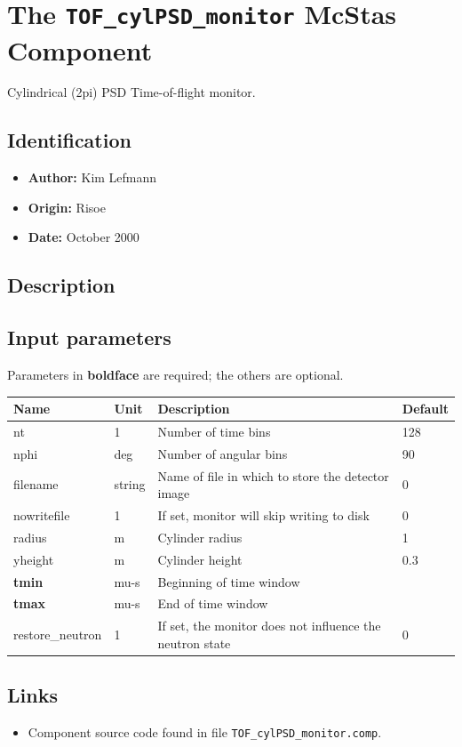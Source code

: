 \section{The \texttt{TOF\_cylPSD\_monitor} McStas Component}
Cylindrical (2pi) PSD Time-of-flight monitor.

\subsection*{Identification}
\begin{itemize}
  \item \textbf{Author:} Kim Lefmann
  \item \textbf{Origin:} Risoe
  \item \textbf{Date:} October 2000
\end{itemize}

\subsection*{Description}


\subsection*{Input parameters}
Parameters in \textbf{boldface} are required; the others are optional.

\begin{longtable}{p{}p{}p{}p{}}
\toprule
\textbf{Name} & \textbf{Unit} & \textbf{Description} & \textbf{Default} \\
\midrule
\endhead
nt & 1 & Number of time bins & 128 \\
nphi & deg & Number of angular bins & 90 \\
filename & string & Name of file in which to store the detector image & 0 \\
nowritefile & 1 & If set, monitor will skip writing to disk & 0 \\
radius & m & Cylinder radius & 1 \\
yheight & m & Cylinder height & 0.3 \\
\textbf{tmin} & mu-s & Beginning of time window &  \\
\textbf{tmax} & mu-s & End of time window &  \\
restore\_neutron & 1 & If set, the monitor does not influence the neutron state & 0 \\
\bottomrule
\end{longtable}

\subsection*{Links}
\begin{itemize}
  \item Component source code found in file \texttt{TOF\_cylPSD\_monitor.comp}.
\end{itemize}
